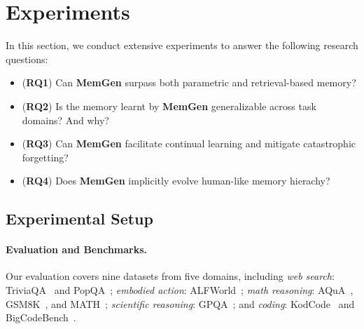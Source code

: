 \documentclass[]{fairmeta}
\newcommand{\ourmethod}{{\fontfamily{lmtt}\selectfont \textbf{MemGen}}\xspace}
\begin{document}
\vspace{-0.4em}
\section{Experiments}
\vspace{-0.7em}
In this section, we conduct extensive experiments to answer the following research questions:
\vspace{-0.2em}
\begin{itemize}[leftmargin=*,itemsep=-0.1em]
\item (\textbf{RQ1}) Can \ourmethod surpass both parametric and retrieval-based memory?
\item (\textbf{RQ2}) Is the memory learnt by \ourmethod generalizable across task domains? And why?
\item (\textbf{RQ3}) Can \ourmethod facilitate continual learning and mitigate catastrophic forgetting?
\item (\textbf{RQ4}) Does \ourmethod implicitly evolve human-like memory hierachy?
\end{itemize}
\vspace{-0.7em}
\subsection{Experimental Setup}\label{sec:setup}



\vspace{-0.3em}
\paragraph{Evaluation and Benchmarks.} Our evaluation covers nine datasets from five domains, including \textit{ web search}: TriviaQA~\citep{joshi-etal-2017-triviaqa} and PopQA~\citep{mallen2023popqatrustlanguagemodelsinvestigating}; \textit{ embodied action}: ALFWorld~\citep{shridhar2021alfworldaligningtextembodied}; \textit{ math reasoning}: AQuA~\citep{ling2017aqua}, GSM8K~\citep{cobbe2021trainingverifier}, and MATH~\citep{hendrycks2021measuringmathematicalproblemsolving}; \textit{ scientific reasoning}: GPQA~\citep{rein2023gpqagraduatelevelgoogleproofqa}; and \textit{ coding}: KodCode~\citep{xu2025kodcodediversechallengingverifiable} and BigCodeBench~\citep{jain2024livecodebenchholisticcontaminationfree}.
\end{document}
